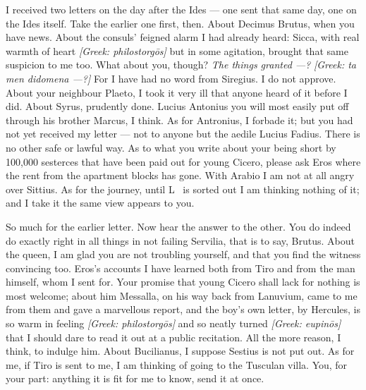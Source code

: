 

 I received two letters on the day after the Ides --- one sent that same day, one on the Ides itself. Take the earlier one first, then. About Decimus Brutus, when you have news. About the consuls' feigned alarm I had already heard: Sicca, with real warmth of heart \textit{[Greek: philostorg\=os]} but in some agitation, brought that same suspicion to me too. What about you, though? \textit{The things granted ---?} \textit{[Greek: ta men didomena ---?]} For I have had no word from \dag Siregius\dag. I do not approve. About your neighbour Plaeto, I took it very ill that anyone heard of it before I did. About Syrus, prudently done. Lucius Antonius you will most easily put off through his brother Marcus, I think. As for Antronius, I forbade it; but you had not yet received my letter --- not to anyone but the aedile Lucius Fadius. There is no other safe or lawful way. As to what you write about your being short by 100,000 sesterces that have been paid out for young Cicero, please ask Eros where the rent from the apartment blocks has gone. With Arabio I am not at all angry over Sittius. As for the journey, until \dag L \dag\ is sorted out I am thinking nothing of it; and I take it the same view appears to you.

 So much for the earlier letter. Now hear the answer to the other. You do indeed do exactly right in all things in not failing Servilia, that is to say, Brutus. About the queen, I am glad you are not troubling yourself, and that you find the witness convincing too. Eros's accounts I have learned both from Tiro and from the man himself, whom I sent for. Your promise that young Cicero shall lack for nothing is most welcome; about him Messalla, on his way back from Lanuvium, came to me from them and gave a marvellous report, and the boy's own letter, by Hercules, is so warm in feeling \textit{[Greek: philostorg\=os]} and so neatly turned \textit{[Greek: eupin\=os]} that I should dare to read it out at a public recitation. All the more reason, I think, to indulge him. About Bucilianus, I suppose Sestius is not put out. As for me, if Tiro is sent to me, I am thinking of going to the Tusculan villa. You, for your part: anything it is fit for me to know, send it at once.
